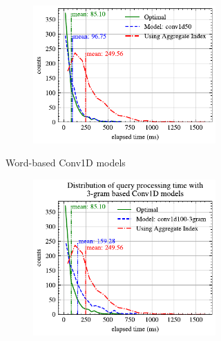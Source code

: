 \documentclass[conference]{IEEEtran}
\begin{document}
\begin{figure}[!h]
\begin{subfigure}{0.45\textwidth}
\begin{subfigure}{\textwidth}
			\includegraphics[]{graphics/perf_dist_conv1d50_A.pdf}
		\end{subfigure}
		\caption{Word-based Conv1D models}
	\end{subfigure}
	\hfill
	\begin{subfigure}{0.45\textwidth}
		\begin{subfigure}{\textwidth}
			\centering
			\includegraphics[]{graphics/perf_dist_conv1d100_3gram_A.pdf}
		\end{subfigure}
		\vfill
		\begin{subfigure}{\textwidth}
			\centering

\end{subfigure}
\end{subfigure}
\end{figure}
\end{document}
